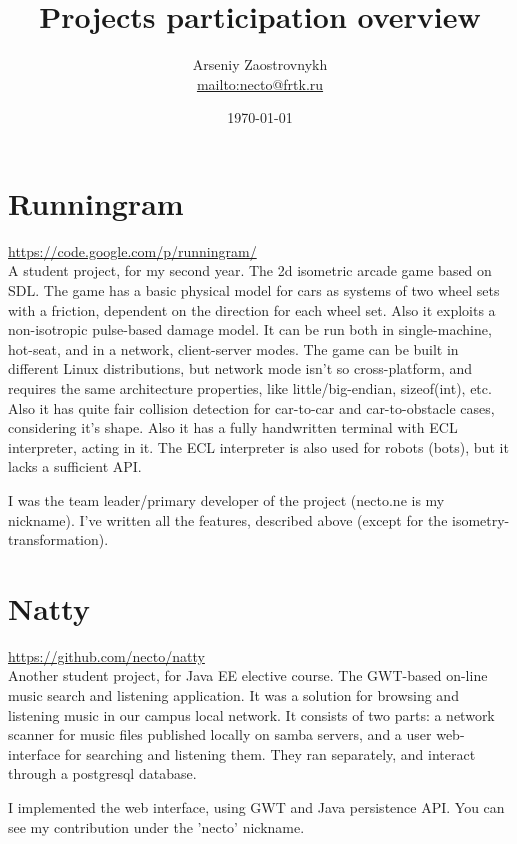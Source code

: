 \documentclass{proc}
\title{Projects participation overview}
\author{Arseniy Zaostrovnykh\\
 \url{mailto:necto@frtk.ru}}
\date{\today}
\begin{document}
\maketitle

\section*{Runningram}
\url{https://code.google.com/p/runningram/}\\
A student project, for my second year. The 2d isometric arcade game based on SDL. The game has a basic physical model for cars as systems of two wheel sets with a friction, dependent on the direction for each wheel set. Also it exploits a non-isotropic pulse-based damage model. It can be run both in single-machine, hot-seat, and in a network, client-server modes. The game can be built in different Linux distributions, but network mode isn't so cross-platform, and requires the same architecture properties, like little/big-endian, sizeof(int), etc. Also it has quite fair collision detection for car-to-car and car-to-obstacle cases, considering it's shape. Also it has a fully handwritten terminal with ECL interpreter, acting in it. The ECL interpreter is also used for robots (bots), but it lacks a sufficient API.

I was the team leader/primary developer of the project (necto.ne is my nickname). I've written all the features, described above (except for the isometry-transformation).

\section*{Natty}
\url{https://github.com/necto/natty}\\
Another student project, for Java EE elective course. The GWT-based on-line music search and listening application. It was a solution for browsing and listening music in our campus local network. It consists of two parts: a network scanner for music files published locally on samba servers, and a user web-interface for searching and listening them. They ran separately, and interact through a postgresql database.

I implemented the web interface, using GWT and Java persistence API. You can see my contribution under the 'necto' nickname.
\end{document}
